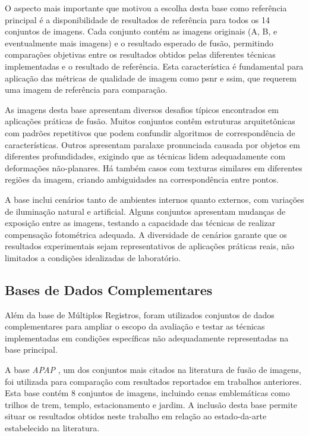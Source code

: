 O aspecto mais importante que motivou a escolha desta base como referência principal é a disponibilidade de resultados de referência para todos os 14 conjuntos de imagens. Cada conjunto contém as imagens originais (A, B, e eventualmente mais imagens) e o resultado esperado de fusão, permitindo comparações objetivas entre os resultados obtidos pelas diferentes técnicas implementadas e o resultado de referência. Esta característica é fundamental para aplicação das métricas de qualidade de imagem como \gls{psnr} e \gls{ssim}, que requerem uma imagem de referência para comparação.

As imagens desta base apresentam diversos desafios típicos encontrados em aplicações práticas de fusão. Muitos conjuntos contêm estruturas arquitetônicas com padrões repetitivos que podem confundir algoritmos de correspondência de características. Outros apresentam paralaxe pronunciada causada por objetos em diferentes profundidades, exigindo que as técnicas lidem adequadamente com deformações não-planares. Há também casos com texturas similares em diferentes regiões da imagem, criando ambiguidades na correspondência entre pontos.

A base inclui cenários tanto de ambientes internos quanto externos, com variações de iluminação natural e artificial. Alguns conjuntos apresentam mudanças de exposição entre as imagens, testando a capacidade das técnicas de realizar compensação fotométrica adequada. A diversidade de cenários garante que os resultados experimentais sejam representativos de aplicações práticas reais, não limitados a condições idealizadas de laboratório.

\subsection{Bases de Dados Complementares}

Além da base de Múltiplos Registros, foram utilizados conjuntos de dados complementares para ampliar o escopo da avaliação e testar as técnicas implementadas em condições específicas não adequadamente representadas na base principal.

A base \textit{APAP} \cite{zaragoza2013projective}, um dos conjuntos mais citados na literatura de fusão de imagens, foi utilizada para comparação com resultados reportados em trabalhos anteriores. Esta base contém 8 conjuntos de imagens, incluindo cenas emblemáticas como trilhos de trem, templo, estacionamento e jardim. A inclusão desta base permite situar os resultados obtidos neste trabalho em relação ao estado-da-arte estabelecido na literatura.

